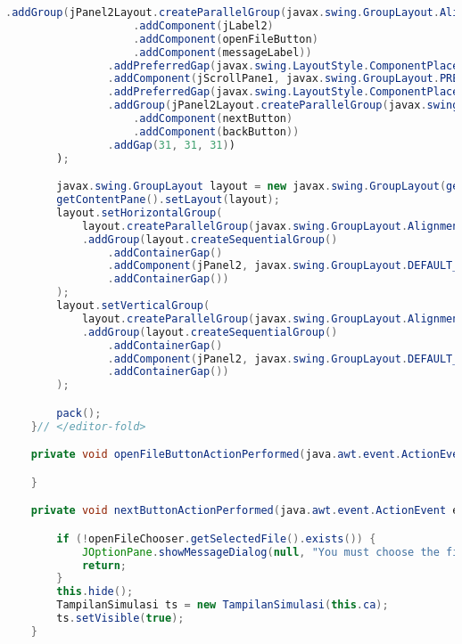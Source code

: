 \begin{lstlisting}[language=Java, caption=TampilanDataWirausaha.java]
                .addGroup(jPanel2Layout.createParallelGroup(javax.swing.GroupLayout.Alignment.BASELINE)
                    .addComponent(jLabel2)
                    .addComponent(openFileButton)
                    .addComponent(messageLabel))
                .addPreferredGap(javax.swing.LayoutStyle.ComponentPlacement.UNRELATED)
                .addComponent(jScrollPane1, javax.swing.GroupLayout.PREFERRED_SIZE, 319, javax.swing.GroupLayout.PREFERRED_SIZE)
                .addPreferredGap(javax.swing.LayoutStyle.ComponentPlacement.RELATED, 65, Short.MAX_VALUE)
                .addGroup(jPanel2Layout.createParallelGroup(javax.swing.GroupLayout.Alignment.BASELINE)
                    .addComponent(nextButton)
                    .addComponent(backButton))
                .addGap(31, 31, 31))
        );

        javax.swing.GroupLayout layout = new javax.swing.GroupLayout(getContentPane());
        getContentPane().setLayout(layout);
        layout.setHorizontalGroup(
            layout.createParallelGroup(javax.swing.GroupLayout.Alignment.LEADING)
            .addGroup(layout.createSequentialGroup()
                .addContainerGap()
                .addComponent(jPanel2, javax.swing.GroupLayout.DEFAULT_SIZE, javax.swing.GroupLayout.DEFAULT_SIZE, Short.MAX_VALUE)
                .addContainerGap())
        );
        layout.setVerticalGroup(
            layout.createParallelGroup(javax.swing.GroupLayout.Alignment.LEADING)
            .addGroup(layout.createSequentialGroup()
                .addContainerGap()
                .addComponent(jPanel2, javax.swing.GroupLayout.DEFAULT_SIZE, javax.swing.GroupLayout.DEFAULT_SIZE, Short.MAX_VALUE)
                .addContainerGap())
        );

        pack();
    }// </editor-fold>                        

    private void openFileButtonActionPerformed(java.awt.event.ActionEvent evt) {                                               

    }                                              

    private void nextButtonActionPerformed(java.awt.event.ActionEvent evt) {                                           

        if (!openFileChooser.getSelectedFile().exists()) {
            JOptionPane.showMessageDialog(null, "You must choose the file first!");
            return;
        }
        this.hide();
        TampilanSimulasi ts = new TampilanSimulasi(this.ca);
        ts.setVisible(true);
    }                                          


\end{lstlisting}
